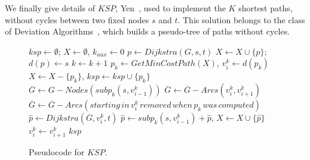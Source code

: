 We finally give details of $KSP$, Yen~\cite{14}, used to implement the $K$ shortest paths, 
without cycles between two fixed nodes $s$ and $t$. This solution belongs to the 
class of Deviation Algorithms~\cite{22}, which builds a pseudo-tree of paths 
without cycles.

\begin{figure}[H]
\begin{algorithm}[H]
\caption{$ksp = KSP(G,s,t,k)$}
\begin{algorithmic}[1]
\STATE $ksp \leftarrow \emptyset$; $X \leftarrow \emptyset$, $k_{aux} \leftarrow 0$
\STATE $p \leftarrow Dijkstra(G,s,t)$
\STATE $X \leftarrow X\cup \{p\}$; $d(p) \leftarrow s$
\STATE $k \leftarrow k+1$
\STATE $p_k \leftarrow GetMinCostPath(X)$, $v_{i}^{k} \leftarrow d(p_k)$ 
\STATE $X \leftarrow X-\{p_k\}$, $ksp \leftarrow ksp \cup \{p_k\}$
\STATE $\overline{G} \leftarrow G-Nodes(subp_k(s,v_{i-1}^{k}))$
\STATE $\overline{G} \leftarrow \overline{G}-Arcs(v_{i}^{k},v_{i+1}^{k})$
\STATE $\overline{G} \leftarrow \overline{G}-Arcs(starting \, in \, v_{i}^{k} \, removed \, when \, p_k \, was \,  computed)$
\STATE $\hat{p} \leftarrow Dijkstra(\overline{G},v_{i}^{k},t)$
\STATE $\hat{p} \leftarrow subp_k(s,v_{i-1}^{k}) +\hat{p}$, $X \leftarrow X \cup \{\hat{p}\}$
\ENDIF
\STATE $v_{i}^{k} \leftarrow v_{i+1}^{k}$
\ENDWHILE
\ENDIF
\ENDWHILE
\ENDIF
\RETURN $ksp$
\end{algorithmic}
\end{algorithm}
\caption{Pseudocode for $KSP$. \label{ksp2}}
\end{figure}

